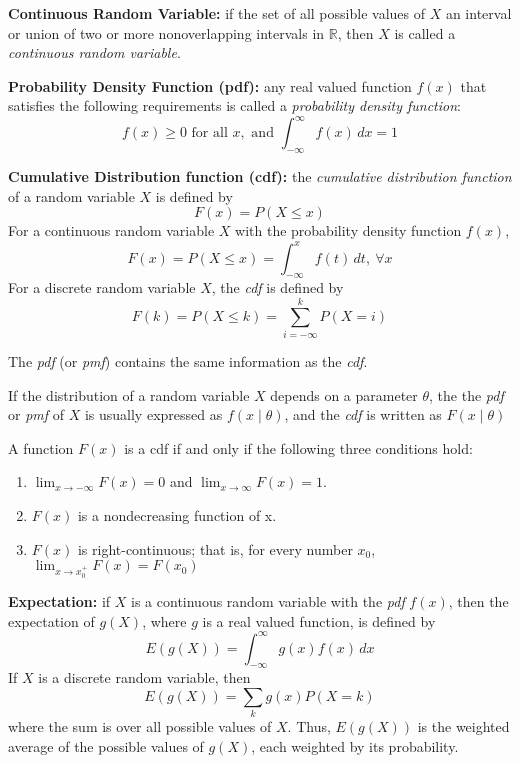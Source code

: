 \begin{definition}
	\textbf{Continuous Random Variable:} if the set of all possible values of $X$ an interval or union of two or more nonoverlapping intervals in $\mathbb{R}$, then $X$ is called a \textit{continuous random variable}.
\end{definition}

\begin{definition}
	\textbf{Probability Density Function (pdf):} any real valued function $f(x)$ that satisfies the following requirements is called a \textit{probability density function}:
	\[
		f(x) \geq 0 \text{ for all } x, \text{ and } \int_{-\infty}^{\infty}f(x)\,dx = 1
	\]
\end{definition}

\begin{definition}
	\textbf{Cumulative Distribution function (cdf):} the \textit{cumulative distribution function} of a random variable $X$ is defined by
	\[
		F(x) = P(X \leq x)
	\]
	For a continuous random variable $X$ with the probability density function $f(x)$,
	\[
	F(x) = P(X \leq x) = \int_{-\infty}^x f(t)\,dt, \ \forall x
	\]
	For a discrete random variable $X$, the \textit{cdf} is defined by
	\[
	F(k) = P(X \leq k) = \sum_{i = -\infty}^k P(X = i)
	\]
\end{definition}
The \textit{pdf} (or \textit{pmf}) contains the same information as the \textit{cdf}.

If the distribution of a random variable $X$ depends on a parameter $\theta$, the the \textit{pdf} or \textit{pmf} of $X$ is usually expressed as $f(x \mid \theta)$, and the \textit{cdf} is written as $F(x \mid \theta)$
\begin{theorem}
	A function $F(x)$ is a cdf if and only if the following three conditions hold:
	\begin{enumerate}[\bfseries a)]
		\item $\lim_{x \rightarrow -\infty}F(x) = 0$ and $\lim_{x \rightarrow \infty}F(x) = 1$.
		\item $F(x)$ is a nondecreasing function of x.
		\item $F(x)$ is right-continuous; that is, for every number $x_0$, $\lim_{x \rightarrow x_0^{+}} F(x) = F(x_0)$
	\end{enumerate}
\end{theorem}

\begin{definition}
	\textbf{Expectation:} if $X$ is a continuous random variable with the \textit{pdf} $f(x)$, then the expectation of $g(X)$, where $g$ is a real valued function, is defined by
	\[
		E(g(X)) = \int_{-\infty}^{\infty}g(x)f(x)\,dx
	\]
	If $X$ is a discrete random variable, then
	\[
		E(g(X)) = \sum_k g(x) P(X = k)
	\]
	where the sum is over all possible values of $X$. Thus, $E(g(X))$ is the weighted average of the possible values of $g(X)$, each weighted by its probability.
\end{definition}

